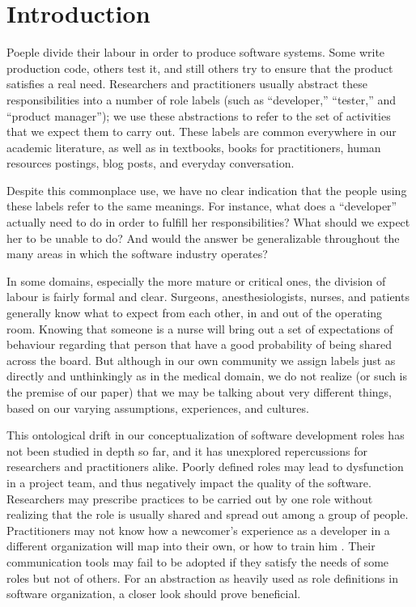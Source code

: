 \documentclass[10pt, conference, compsocconf]{IEEEtran}
\begin{document}
\section{Introduction}

Poeple divide their labour in order to produce software systems. Some write production code, others test it, and still others try to ensure that the product satisfies a real need. Researchers and practitioners usually abstract these responsibilities into a number of role labels (such as ``developer,'' ``tester,'' and ``product manager''); we use these abstractions to refer to the set of activities that we expect them to carry out. These labels are common everywhere in our academic literature, as well as in textbooks, books for practitioners, human resources postings, blog posts, and everyday conversation.

Despite this commonplace use, we have no clear indication that the people using these labels refer to the same meanings. For instance, what does a ``developer'' actually need to do in order to fulfill her responsibilities? What should we expect her to be unable to do? And would the answer be generalizable throughout the many areas in which the software industry operates?

In some domains, especially the more mature or critical ones, the division of labour is fairly formal and clear. Surgeons, anesthesiologists, nurses, and patients generally know what to expect from each other, in and out of the operating room. Knowing that someone is a nurse will bring out a set of expectations of behaviour regarding that person that have a good probability of being shared across the board. But although in our own community we assign labels just as directly and unthinkingly as in the medical domain, we do not realize (or such is the premise of our paper) that we may be talking about very different things, based on our varying assumptions, experiences, and cultures.

This ontological drift \cite{Robinson1991} in our conceptualization of software development roles has not been studied in depth so far, and it has unexplored repercussions for researchers and practitioners alike. Poorly defined roles may lead to dysfunction in a project team, and thus negatively impact the quality of the software. Researchers may prescribe practices to be carried out by one role without realizing that the role is usually shared and spread out among a group of people. Practitioners may not know how a newcomer's experience as a developer in a different organization will map into their own, or how to train him \cite{Dagenais2010}. Their communication tools may fail to be adopted if they satisfy the needs of some roles but not of others. For an abstraction as heavily used as role definitions in software organization, a closer look should prove beneficial.
\end{document}
